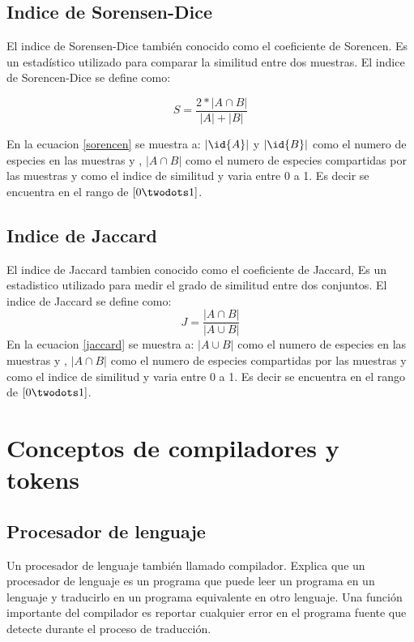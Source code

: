 \subsection{Indice de Sorensen-Dice}
El indice de Sorensen-Dice también conocido como el coeficiente de Sorencen. Es un estadístico utilizado para comparar la similitud entre dos muestras. El indice de Sorencen-Dice se define como:

\begin{equation}
S = \frac{2*|A \cap B|}{|A|+|B|}
\label{sorencen}
\end{equation}

En la ecuacion \ref{sorencen} se muestra a: $|\id{A}|$ y $|\id{B}|$ como el numero de especies en las muestras  y , $|A \cap B|$ como el numero de especies compartidas por las muestras y  como el indice de similitud y varia entre 0 a 1. Es decir se encuentra en el rango de $[0 \twodots 1]$.

\subsection{Indice de Jaccard}
El indice de Jaccard tambien conocido como el coeficiente de Jaccard, Es un estadistico utilizado para medir el grado de similitud entre dos conjuntos. El indice de Jaccard se define como:
\begin{equation}
J = \frac{|A \cap B|}{|A \cup B|}
\label{jaccard}
\end{equation}
En la ecuacion \ref{jaccard} se muestra a: $|A \cup B|$ como el numero de especies en las muestras  y , $|A \cap B|$ como el numero de especies compartidas por las muestras y  como el indice de similitud y varia entre 0 a 1. Es decir se encuentra en el rango de $[0 \twodots 1]$.

\section{Conceptos de compiladores y tokens}
\subsection{Procesador de lenguaje}
Un procesador de lenguaje también llamado compilador. \cite{Aho2008} Explica que un procesador de lenguaje es un programa que puede leer un programa en un lenguaje y traducirlo en un programa equivalente en otro lenguaje. Una función importante del compilador es reportar cualquier error en el programa fuente que detecte durante el proceso de traducción.


